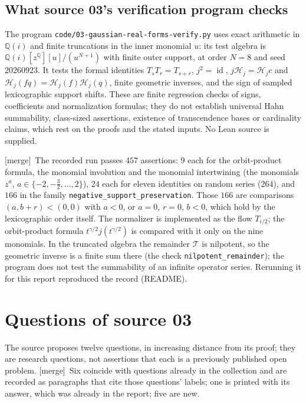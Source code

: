 \documentclass[11pt]{article}
\theoremstyle{definition}
\theoremstyle{remark}
\newcommand{\Q}{\mathbb Q}
\newcommand{\id}{\operatorname{id}}
\newcommand{\mergetag}{\textup{[merge]}}
\numberwithin{equation}{section}
\begin{document}
\subsection{What source 03's verification program checks}\label{saut:gr:sec:verifier}

The program \texttt{code/03-gaussian-real-forms-verify.py} uses exact arithmetic in
$\Q(i)$ and finite truncations in the inner monomial $u$: its test algebra is
$\Q(i)[z^{\Q}][u]/(u^{N+1})$ with finite outer support, at order $N=8$ and seed
$20260923$. It tests the formal identities $T_sT_r=T_{s+r}$, $j^2=\id$,
$j\mathcal H_j=\mathcal H_jc$ and $\mathcal H_j(fq)=\mathcal H_j(f)\mathcal H_j(q)$, finite geometric
inverses, and the sign of sampled lexicographic support shifts. These are finite
regression checks of signs, coefficients and normalization formulas; they do not
establish universal Hahn summability, class-sized assertions, existence of
transcendence bases or cardinality claims, which rest on the proofs and the stated
inputs. No Lean source is supplied.

\mergetag\ The recorded run passes $457$ assertions: $9$ each for the orbit-product formula,
the monomial involution and the monomial intertwining (the monomials $z^a$,
$a\in\{-2,-\tfrac32,\ldots,2\}$), $24$ each for eleven identities on random series
($264$), and $166$ in the family \texttt{negative\_support\_preservation}. Those $166$ are
comparisons $(a,b+r)<(0,0)$ with $a<0$, or $a=0$, $r=0$, $b<0$, which hold by the
lexicographic order itself. The normalizer is implemented as the flow $T_{i/2}$; the
orbit-product formula $t^{\gamma/2}j(t^{\gamma/2})$ is compared with it only on the nine
monomials. In the truncated algebra the remainder $\mathcal T$ is nilpotent, so the
geometric inverse is a finite sum there (the check \texttt{nilpotent\_remainder}); the
program does not test the summability of an infinite operator series. Rerunning it for
this report reproduced the record (README).

\section{Questions of source 03}\label{saut:gr:sec:questions}

The source proposes twelve questions, in increasing distance from its proof; they are
research questions, not assertions that each is a previously published open problem.
\mergetag\ Six coincide with questions already in the collection and are recorded
as paragraphs that cite those questions' labels; one is printed with its answer, which
was already in the report; five are new.
\end{document}
